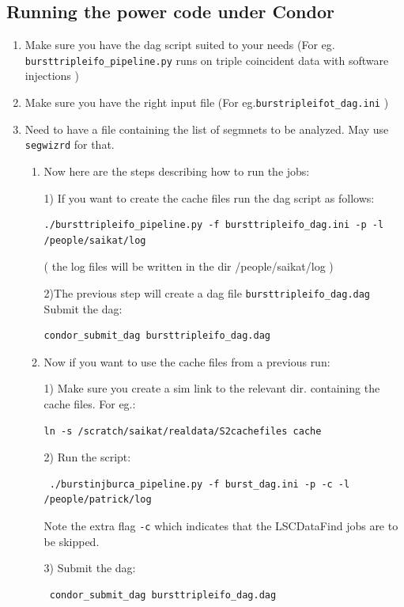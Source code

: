 \clearpage


\subsection{Running the power code under Condor}
\label{subsection:running_power}

\begin{enumerate}

\item Make sure you have the dag script suited to your needs
(For eg. \texttt{bursttripleifo\_pipeline.py} runs on triple coincident data
with software injections )

\item Make sure you have the right input file (For eg.\texttt{burstripleifot\_dag.ini} )

\item Need to have a file containing the list of segmnets to be analyzed. 
May use \texttt{segwizrd} for that.

\begin{enumerate}

\item Now here are the steps describing how to run the jobs: 

1) If you want to create the cache files run the dag script as follows: 
\begin{verbatim}
./bursttripleifo_pipeline.py -f bursttripleifo_dag.ini -p -l /people/saikat/log 
\end{verbatim}    
( the log files will be written in the dir /people/saikat/log )     

2)The previous step will create a dag file \texttt{bursttripleifo\_dag.dag}
Submit the dag:
\begin{verbatim}
condor_submit_dag bursttripleifo_dag.dag 
\end{verbatim}

\item  Now if you want to use the cache files from a previous run:    

1) Make sure you create a sim link to the relevant
dir. containing the cache files. For eg.:
\begin{verbatim}
ln -s /scratch/saikat/realdata/S2cachefiles cache   
\end{verbatim}

2) Run the script: 
\begin{verbatim}
 ./burstinjburca_pipeline.py -f burst_dag.ini -p -c -l /people/patrick/log    
\end{verbatim}
Note the extra flag \texttt{-c} which indicates that the LSCDataFind jobs are
to be skipped.
 
3) Submit the dag:
\begin{verbatim}
 condor_submit_dag bursttripleifo_dag.dag
\end{verbatim}
\end{enumerate}
\end{enumerate}

